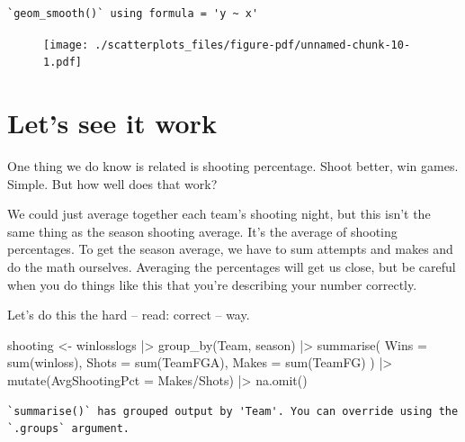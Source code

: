 \documentclass[
  letterpaper,
  DIV=11,
  numbers=noendperiod]{scrreprt}
\newenvironment{Shaded}{\begin{snugshade}}{\end{snugshade}}
\newcommand{\AttributeTok}[1]{\textcolor[rgb]{0.40,0.45,0.13}{#1}}
\newcommand{\FunctionTok}[1]{\textcolor[rgb]{0.28,0.35,0.67}{#1}}
\newcommand{\NormalTok}[1]{\textcolor[rgb]{0.00,0.23,0.31}{#1}}
\newcommand{\OtherTok}[1]{\textcolor[rgb]{0.00,0.23,0.31}{#1}}
\newcommand{\SpecialCharTok}[1]{\textcolor[rgb]{0.37,0.37,0.37}{#1}}
\begin{document}
\begin{verbatim}
`geom_smooth()` using formula = 'y ~ x'
\end{verbatim}

\begin{figure}[H]

{\centering \texttt{[image: ./scatterplots\_files/figure-pdf/unnamed-chunk-10-1.pdf]}

}

\end{figure}

\hypertarget{lets-see-it-work}{%
\section{Let's see it work}\label{lets-see-it-work}}

One thing we do know is related is shooting percentage. Shoot better,
win games. Simple. But how well does that work?

We could just average together each team's shooting night, but this
isn't the same thing as the season shooting average. It's the average of
shooting percentages. To get the season average, we have to sum attempts
and makes and do the math ourselves. Averaging the percentages will get
us close, but be careful when you do things like this that you're
describing your number correctly.

Let's do this the hard -- read: correct -- way.

\begin{Shaded}
\begin{Highlighting}[]
\NormalTok{shooting }\OtherTok{\textless{}{-}}\NormalTok{ winlosslogs }\SpecialCharTok{|\textgreater{}} 
  \FunctionTok{group\_by}\NormalTok{(Team, season) }\SpecialCharTok{|\textgreater{}} 
  \FunctionTok{summarise}\NormalTok{(}
    \AttributeTok{Wins =} \FunctionTok{sum}\NormalTok{(winloss), }
    \AttributeTok{Shots =} \FunctionTok{sum}\NormalTok{(TeamFGA),}
    \AttributeTok{Makes =} \FunctionTok{sum}\NormalTok{(TeamFG)}
\NormalTok{    ) }\SpecialCharTok{|\textgreater{}} 
  \FunctionTok{mutate}\NormalTok{(}\AttributeTok{AvgShootingPct =}\NormalTok{ Makes}\SpecialCharTok{/}\NormalTok{Shots) }\SpecialCharTok{|\textgreater{}} 
  \FunctionTok{na.omit}\NormalTok{()}
\end{Highlighting}
\end{Shaded}

\begin{verbatim}
`summarise()` has grouped output by 'Team'. You can override using the
`.groups` argument.
\end{verbatim}
\end{document}
